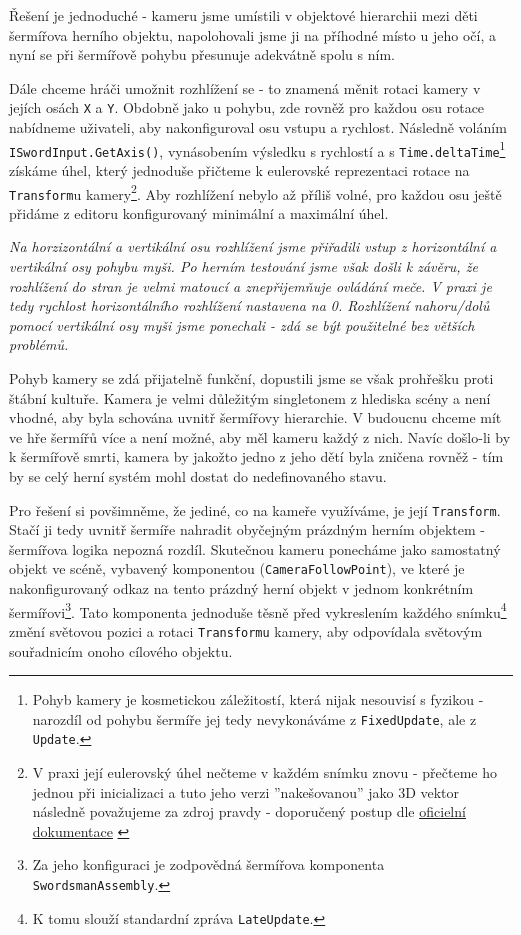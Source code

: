 Řešení je jednoduché - kameru jsme umístili v objektové hierarchii mezi děti šermířova herního objektu, napolohovali jsme ji na příhodné místo u jeho očí, a nyní se při šermířově pohybu přesunuje adekvátně spolu s ním. 

Dále chceme hráči umožnit rozhlížení se - to znamená měnit rotaci kamery v jejích osách \texttt{X} a \texttt{Y}. Obdobně jako u pohybu, zde rovněž pro každou osu rotace nabídneme uživateli, aby nakonfiguroval osu vstupu a rychlost. Následně voláním \texttt{ISwordInput.GetAxis()}, vynásobením výsledku s rychlostí a s \texttt{Time.deltaTime}\footnote{Pohyb kamery je kosmetickou záležitostí, která nijak nesouvisí s fyzikou - narozdíl od pohybu šermíře jej tedy nevykonáváme z \texttt{FixedUpdate}, ale z \texttt{Update}.} získáme úhel, který jednoduše přičteme k eulerovské reprezentaci rotace na \texttt{Transform}u kamery\footnote{V praxi její eulerovský úhel nečteme v každém snímku znovu - přečteme ho jednou při inicializaci a tuto jeho verzi ''nakešovanou'' jako 3D vektor následně považujeme za zdroj pravdy - doporučený postup dle \href{https://docs.unity3d.com/2022.2/Documentation/ScriptReference/Quaternion-eulerAngles.html}{\underline{oficielní dokumentace}} \cite{Unity}}. Aby rozhlížení nebylo až příliš volné, pro každou osu ještě přidáme z editoru konfigurovaný minimální a maximální úhel.

\textit{Na horzizontální a vertikální osu rozhlížení jsme přiřadili vstup z horizontální a vertikální osy pohybu myši. Po herním testování jsme však došli k závěru, že rozhlížení do stran je velmi matoucí a znepřijemňuje ovládání meče. V praxi je tedy rychlost horizontálního rozhlížení nastavena na 0. Rozhlížení nahoru/dolů pomocí vertikální osy myši jsme ponechali - zdá se být použitelné bez větších problémů.}

Pohyb kamery se zdá přijatelně funkční, dopustili jsme se však prohřešku proti štábní kultuře. Kamera je velmi důležitým singletonem z hlediska scény a není vhodné, aby byla schována uvnitř šermířovy hierarchie. V budoucnu chceme mít ve hře šermířů více a není možné, aby měl kameru každý z nich. Navíc došlo-li by k šermířově smrti, kamera by jakožto jedno z jeho dětí byla zničena rovněž - tím by se celý herní systém mohl dostat do nedefinovaného stavu.

Pro řešení si povšimněme, že jediné, co na kameře využíváme, je její \texttt{Transform}. Stačí ji tedy uvnitř šermíře nahradit obyčejným prázdným herním objektem - šermířova logika nepozná rozdíl. Skutečnou kameru ponecháme jako samostatný objekt ve scéně, vybavený komponentou (\texttt{CameraFollowPoint}), ve které je nakonfigurovaný odkaz na tento prázdný herní objekt v jednom konkrétním šermířovi\footnote{Za jeho konfiguraci je zodpovědná šermířova komponenta \texttt{SwordsmanAssembly}.}. Tato komponenta jednoduše těsně před vykreslením každého snímku\footnote{K tomu slouží standardní zpráva \texttt{LateUpdate}.} změní světovou pozici a rotaci \texttt{Transformu} kamery, aby odpovídala světovým souřadnicím onoho cílového objektu. 

